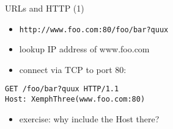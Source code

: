\begin{frame}[fragile]{URLs and HTTP (1)}
\begin{itemize}
    \item \texttt{http://www.foo.com:80/foo/bar?quux}
    \item lookup IP address of www.foo.com
    \item connect via TCP to port 80:
\end{itemize}
\providecommand{\emphThree}[1]{\myemph<3>{#1}}
\begin{Verbatim}[commandchars=X()]
GET /foo/bar?quux HTTP/1.1
Host: XemphThree(www.foo.com:80)
\end{Verbatim}
\begin{itemize}
    \item<3-> exercise: why include the Host there?
\end{itemize}
\end{frame}

